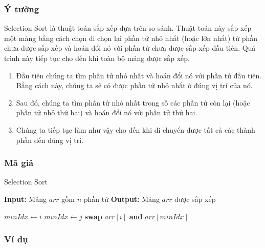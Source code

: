 \subsubsection{Ý tưởng}
Selection Sort là thuật toán sắp xếp dựa trên so sánh. Thuật toán này sắp xếp một mảng bằng cách chọn đi chọn lại phần tử nhỏ nhất (hoặc lớn nhất) từ phần chưa được sắp xếp và hoán đổi nó với phần tử chưa được sắp xếp đầu tiên. Quá trình này tiếp tục cho đến khi toàn bộ mảng được sắp xếp.
\begin{enumerate}
    \item Đầu tiên chúng ta tìm phần tử nhỏ nhất và hoán đổi nó với phần tử đầu tiên. 
    Bằng cách này, chúng ta sẽ có được phần tử nhỏ nhất ở đúng vị trí của nó.
    
    \item Sau đó, chúng ta tìm phần tử nhỏ nhất trong số các phần tử còn lại 
    (hoặc phần tử nhỏ thứ hai) và hoán đổi nó với phần tử thứ hai.
    
    \item Chúng ta tiếp tục làm như vậy cho đến khi di chuyển được tất cả các thành phần đến đúng vị trí.
\end{enumerate}
\subsubsection{Mã giả}

\begin{algorithm}[H]
    \caption{Selection Sort}
    \begin{algorithmic}[1]
        \State \textbf{Input:} Mảng $arr$ gồm $n$ phần tử
        \State \textbf{Output:} Mảng $arr$ được sắp xếp
        
            \State $minIdx \gets i$
                    \State $minIdx \gets j$
                \EndIf
            \EndFor
                \State \textbf{swap} $arr[i]$ \textbf{and} $arr[minIdx]$
            \EndIf
        \EndFor
    \EndProcedure
    \end{algorithmic}
    
\end{algorithm}

\subsubsection{Ví dụ}
